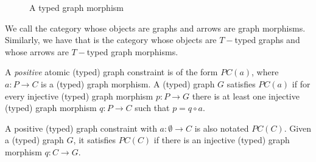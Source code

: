 \begin{example}
\begin{figure}[!ht]
  \centering
  \caption{A typed graph morphism}\label{fig:gts:typed-graph-morphism}
\end{figure}
\end{example}

\begin{remark} We call  the category whose objects are graphs and arrows are graph morphisms. Similarly, we have that  is the category whose objects are $T-$typed graphs and whose arrows are $T-$typed graph morphisms.
\end{remark}

\iffalse
\begin{definition} A \emph{positive} atomic (typed) graph constraint is of the form $PC\left(a\right)$, where $a : P \rightarrow C$ is a (typed) graph morphism. A (typed) graph $G$ satisfies $PC\left(a\right)$ if for every injective (typed) graph morphism $p : P \rightarrow G$ there is at least one injective (typed) graph morphism $q : P \rightarrow C$ such that $p = q \circ a$.

  A positive (typed) graph constraint with $a : \emptyset \rightarrow C$ is also notated $PC\left(C\right)$. Given a (typed) graph $G$, it satisfies $PC\left(C\right)$ if there is an injective (typed) graph morphism $q : C \rightarrow  G$.

\end{definition}

